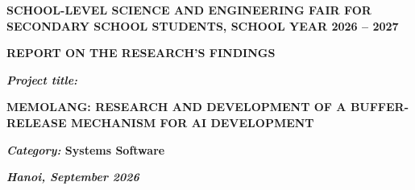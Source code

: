 \documentclass[a4paper]{article}
\begin{document}
	
	\thispagestyle{plain}
	\begin{center}
		\bfseries
		SCHOOL-LEVEL SCIENCE AND ENGINEERING FAIR FOR SECONDARY SCHOOL STUDENTS, SCHOOL YEAR 2026 -- 2027
	\end{center}
	
	\vspace{5cm}
	
	\begin{center}
		\bfseries
		REPORT ON THE RESEARCH'S FINDINGS
	\end{center}
	
	\vspace{3cm}
	
	\begin{center}
		{\Large\bfseries\itshape Project title:}\\[10pt]
		{\Large\bfseries
		\MakeUppercase{MemoLang: Research and Development of a Buffer-Release Mechanism for AI Development}\par}
	\end{center}
	
	\vspace{3cm}
	
	\noindent\textbf{\textit{Category:} Systems Software}
	
	\vspace{6pt}
	
	\vfill
	
	\begin{center}
		\textbf{\textit{Hanoi, September 2026}}
	\end{center}
	
	\newpage
	
	\tableofcontents
	
	\listoffigures
	\listoftables
	
\end{document}
